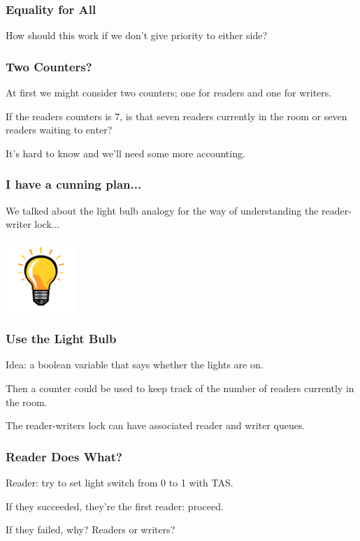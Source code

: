 \begin{frame}
\frametitle{Equality for All}

How should this work if we don't give priority to either side?

\end{frame}

\begin{frame}
\frametitle{Two Counters?}

At first we might consider two counters; one for readers and one for writers. 

If the readers counters is 7, is that seven readers currently in the room or seven readers waiting to enter? 

It's hard to know and we'll need some more accounting.

\end{frame}

\begin{frame}
\frametitle{I have a cunning plan...}

We talked about the light bulb analogy for the way of understanding the reader-writer lock...

\begin{center}
	\includegraphics[width=0.2\textwidth]{images/idea.png}
\end{center}

\end{frame}

\begin{frame}
\frametitle{Use the Light Bulb}

Idea: a boolean variable that says whether the lights are on. 

Then a counter could be used to keep track of the number of readers currently in the room. 

The reader-writers lock can have associated reader and writer queues. 

\end{frame}

\begin{frame}
\frametitle{Reader Does What?}

Reader: try to set light switch from 0 to 1 with TAS.

If they succeeded, they're the first reader: proceed.

If they failed, why? Readers or writers?

\end{frame}

